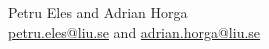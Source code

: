 Petru Eles and Adrian Horga\\
\vspace{0.5em}
\href{mailto:petru.eles@liu.se}{petru.eles@liu.se} and
\href{mailto:adrian.horga@liu.se}{adrian.horga@liu.se}
